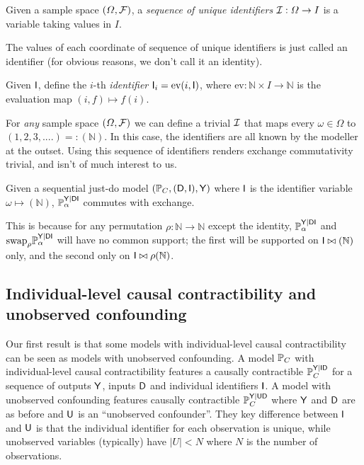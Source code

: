 \begin{definition}
Given a sample space $(\Omega,\mathcal{F})$, a \emph{sequence of unique identifiers} $\mathcal{I}:\Omega\to I$ is a variable taking values in $I$.
\end{definition}

The values of each coordinate of sequence of unique identifiers is just called an identifier (for obvious reasons, we don't call it an identity).

\begin{definition}[Identification]
Given $\mathsf{I}$, define the $i$-th \emph{identifier} $\mathsf{I}_i=\mathrm{ev}(i,\mathsf{I})$, where $\mathrm{ev}:\mathbb{N}\times I\to \mathbb{N}$ is the evaluation map $(i,f)\mapsto f(i)$.
\end{definition}

For \emph{any} sample space $(\Omega,\mathcal{F})$ we can define a trivial $\mathcal{I}$ that maps every $\omega\in\Omega$ to $(1,2,3,....)=:(\mathbb{N})$. In this case, the identifiers are all known by the modeller at the outset. Using this sequence of identifiers renders exchange commutativity trivial, and isn't of much interest to us.

\begin{example}
Given a sequential just-do model $(\mathbb{P}_C, (\mathsf{D},\mathsf{I}),\mathsf{Y})$ where $\mathsf{I}$ is the identifier variable $\omega\mapsto (\mathbb{N})$, $\mathbb{P}_\alpha^{\mathsf{Y}|\mathsf{DI}}$ commutes with exchange.

This is because for any permutation $\rho:\mathbb{N}\to\mathbb{N}$ except the identity, $\mathbb{P}_\alpha^{\mathsf{Y}|\mathsf{DI}}$ and $\text{swap}_{\rho}\mathbb{P}_\alpha^{\mathsf{Y}|\mathsf{DI}}$ will have no common support; the first will be supported on $\mathsf{I}\bowtie (\mathbb{N})$ only, and the second only on $\mathsf{I}\bowtie \rho(\mathbb{N})$.
\end{example}




\subsection{Individual-level causal contractibility and unobserved confounding}

Our first result is that some models with individual-level causal contractibility can be seen as models with unobserved confounding. A model $\mathbb{P}_C$ with individual-level causal contractibility features a causally contractible $\mathbb{P}_C^{\mathsf{Y}|\mathsf{ID}}$ for a sequence of outputs $\mathsf{Y}$, inputs $\mathsf{D}$ and individual identifiers $\mathsf{I}$. A model with unobserved confounding features causally contractible $\mathbb{P}_C^{\mathsf{Y}|\mathsf{UD}}$ where $\mathsf{Y}$ and $\mathsf{D}$ are as before and $\mathsf{U}$ is an ``unobserved confounder''. They key difference between $\mathsf{I}$ and $\mathsf{U}$ is that the individual identifier for each observation is unique, while unobserved variables (typically) have $|U|<N$ where $N$ is the number of observations.



